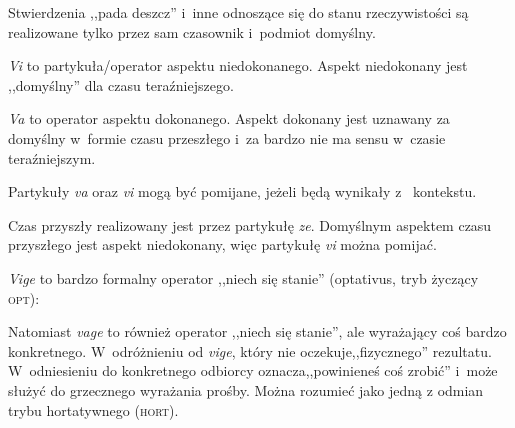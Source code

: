 \begin{spacing}{1.1}
Stwierdzenia ,,pada deszcz'' i~inne odnoszące się do stanu rzeczywistości są
realizowane tylko przez sam czasownik i~podmiot domyślny.



\emph{Vi} to partykuła/operator aspektu niedokonanego. Aspekt niedokonany
jest ,,domyślny'' dla czasu teraźniejszego.




\emph{Va} to operator aspektu dokonanego. Aspekt dokonany jest uznawany za
domyślny w~formie czasu przeszłego i~za bardzo nie ma sensu w~czasie
teraźniejszym.




Partykuły \emph{va} oraz \emph{vi} mogą być pomijane, jeżeli będą wynikały z~
kontekstu.

Czas przyszły realizowany jest przez partykułę \emph{ze}. Domyślnym aspektem
czasu przyszłego jest aspekt niedokonany, więc partykułę \emph{vi} można
pomijać.




\emph{Vige} to bardzo formalny operator ,,niech się stanie'' (optativus, tryb
życzący \textsc{opt}):


Natomiast \emph{vage} to również operator ,,niech się stanie'', ale wyrażający
coś bardzo konkretnego. W~odróżnieniu od \emph{vige}, który nie
oczekuje,,fizycznego'' rezultatu. W~odniesieniu do konkretnego odbiorcy
oznacza,,powinieneś coś zrobić'' i~może służyć do grzecznego wyrażania prośby.
Można rozumieć jako jedną z odmian trybu hortatywnego (\textsc{hort}).



\end{spacing}
